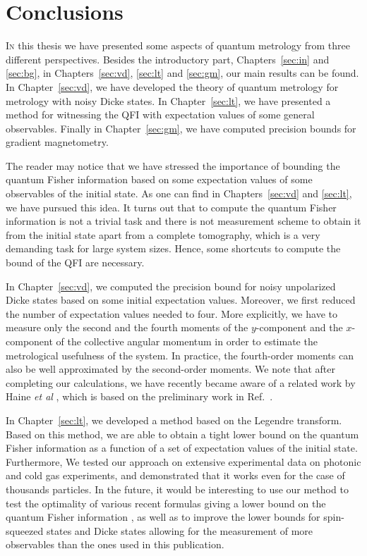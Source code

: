 \section[Conclusions]
{Conclusions}


\lettrine[lines=2, findent=3pt, nindent=0pt]{I}{n} this thesis we have presented some aspects of quantum metrology from three different perspectives.
Besides the introductory part, Chapters~\ref{sec:in} and \ref{sec:bg}, in Chapters~\ref{sec:vd}, \ref{sec:lt} and \ref{sec:gm}, our main results can be found.
In Chapter~\ref{sec:vd}, we have developed the theory of quantum metrology for metrology with noisy Dicke states.
In Chapter~\ref{sec:lt}, we have presented a method for witnessing the QFI with expectation values of some general observables.
Finally in Chapter~\ref{sec:gm}, we have computed precision bounds for gradient magnetometry.

The reader may notice that we have stressed the importance of bounding the quantum Fisher information based on some expectation values of some observables of the initial state.
As one can find in Chapters~\ref{sec:vd} and \ref{sec:lt}, we have pursued this idea.
It turns out that to compute the quantum Fisher information is not a trivial task and there is not measurement scheme to obtain it from the initial state apart from a complete tomography, which is a very demanding task for large system sizes.
Hence, some shortcuts to compute the bound of the QFI are necessary.

In Chapter~\ref{sec:vd}, we computed the precision bound for noisy unpolarized Dicke states based on some initial expectation values.
Moreover, we first reduced the number of expectation values needed to four.
More explicitly, we have to measure only the second and the fourth moments of the $y$-component and the $x$-component of the collective angular momentum in order to estimate the metrological usefulness of the system.
In practice, the fourth-order moments can also be well approximated by the second-order moments.
We note that after completing our calculations, we have recently became aware of a related work by Haine {\it et al} \cite{Haine2015}, which is based on the preliminary work in Ref.~\cite{Szigeti2014}.

In Chapter~\ref{sec:lt}, we developed a method based on the Legendre transform.
Based on this method, we are able to obtain a tight lower bound on the quantum Fisher information as a function of a set of expectation values of the initial state.
Furthermore, We tested our approach on extensive experimental data on photonic and cold gas experiments, and demonstrated that it works even for the case of thousands particles.
In the future, it would be interesting to use our method to test the optimality of various recent formulas giving a lower bound on the quantum Fisher information \cite{Zhang2014, Oudot2015}, as well as to improve the lower bounds for spin-squeezed states and Dicke states allowing for the measurement of more observables than the ones used in this publication.

